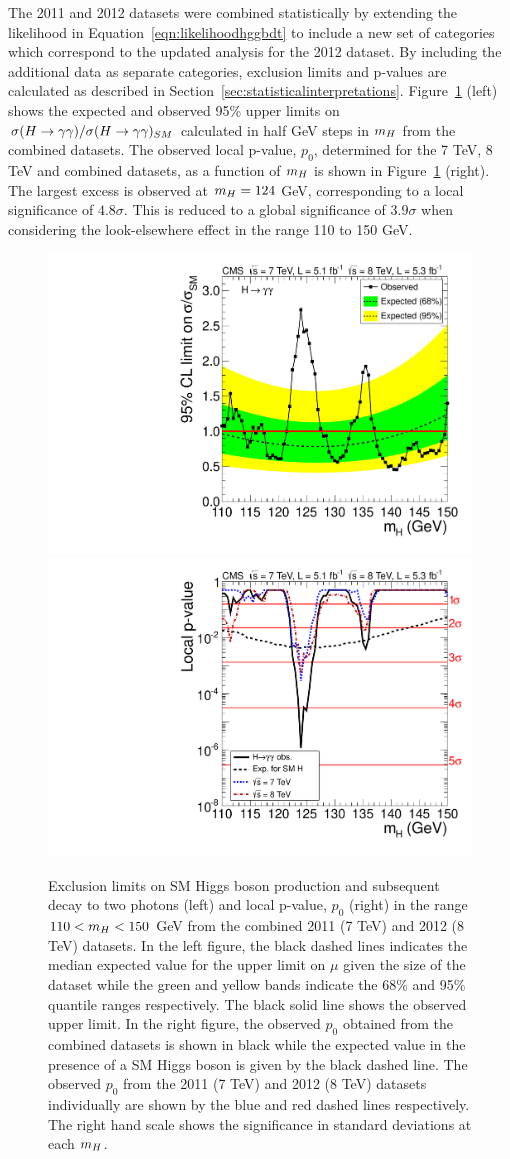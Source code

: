 The 2011 and 2012 datasets were combined statistically by extending the likelihood in 
Equation~\ref{eqn:likelihoodhggbdt}
to include a new set of categories which correspond to the updated analysis for the 2012 dataset.
By including the additional data as separate categories, 
exclusion limits and p-values are calculated as described in Section~\ref{sec:statisticalinterpretations}.
Figure~\ref{fig:limits8TeV} (left) shows the expected and observed 95\% upper limits 
on $\sigma(H\rightarrow\gamma\gamma)/\sigma(H\rightarrow\gamma\gamma)_{SM}$ calculated in half GeV steps in $m_{H}$
from the combined datasets. The observed local p-value, $p_{0}$, determined
for the 7 TeV, 8 TeV and combined datasets, as a function of $m_{H}$ is shown in Figure~\ref{fig:limits8TeV} (right).
The largest excess is observed at $m_{H}=124$ GeV, corresponding to a local significance of $4.8\sigma$.
This is reduced to a global significance of $3.9\sigma$ when considering the look-elsewhere effect in 
the range 110 to 150 GeV.

\begin{figure}
\begin{center}
  \includegraphics[width=.49\textwidth]{hgg8TeV/hgg_MassWindowLimit.pdf}
  \includegraphics[width=.49\textwidth]{hgg8TeV/hgg_MassWindowPValue.pdf}
 \caption{Exclusion limits on SM Higgs boson production and subsequent decay to two photons
(left) and local p-value, $p_{0}$ (right) in the range
 $110 < m_{H} < 150$ GeV from the combined 2011 (7 TeV) and 2012 (8 TeV) datasets. 
 In the left figure, the black dashed lines indicates 
 the median expected value for the upper limit on $\mu$ 
 given the size of the dataset while the green and yellow bands indicate 
 the 68\% and 95\% quantile ranges respectively.
 The black solid line shows the observed upper limit.
 In the right figure, the observed $p_{0}$ obtained from the combined 
 datasets is shown in black while the expected value in the presence of a
 SM Higgs boson is given by the black dashed line. The observed $p_{0}$ from the 2011 (7 TeV) 
 and 2012 (8 TeV) datasets individually are shown by the 
 blue and red dashed lines respectively. The right hand scale shows the significance in 
 standard deviations at each $m_{H}$.}
\end{center}
 \label{fig:limits8TeV}
\end{figure}


